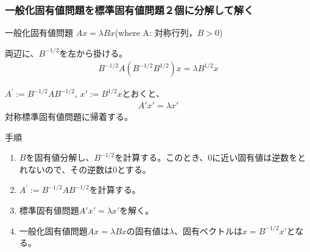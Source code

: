 
\begin{frame}[c,fragile]
  \frametitle{一般化固有値問題を標準固有値問題２個に分解して解く}
一般化固有値問題
$A x = \lambda B x$\quad(where A: 対称行列，$B>0$)

両辺に、$B^{-1/2}$を左から掛ける。
\begin{align}
B^{-1/2} A (B^{-1/2} B^{1/2}) x = \lambda B^{1/2} x
\end{align}

$A^\prime := B^{-1/2} A B^{-1/2},\,  x' := B^{1/2} x$とおくと、
\begin{align}
A' x' = \lambda x'
\end{align}
対称標準固有値問題に帰着する。

手順\\
\begin{enumerate}
\item $B$を固有値分解し、$B^{-1/2}$を計算する。このとき、$0$に近い固有値は逆数をとれないので、その逆数は$0$とする。
\item $A^\prime := B^{-1/2} A B^{-1/2}$を計算する。
\item 標準固有値問題$A' x' = \lambda x'$を解く。
\item 一般化固有値問題$A x = \lambda B x$の固有値は$\lambda$、固有ベクトルは$x=B^{-1/2}x'$となる。
\end{enumerate}
\end{frame}


